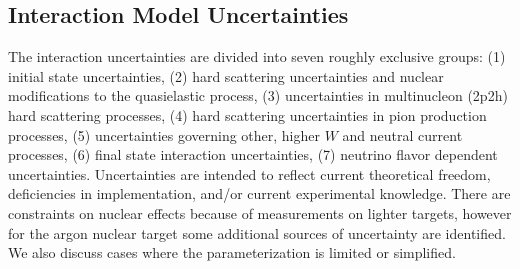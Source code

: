 
\subsection{Interaction Model Uncertainties}

The interaction uncertainties are divided into seven roughly exclusive groups: (1) initial state uncertainties, (2) hard scattering uncertainties and nuclear modifications to the quasielastic process, (3) uncertainties in multinucleon (2p2h) hard scattering processes, (4) hard scattering uncertainties in pion production processes, (5) uncertainties governing other, higher $W$ and neutral current processes, (6) final state interaction uncertainties, (7) neutrino flavor dependent uncertainties. Uncertainties are intended to reflect current theoretical freedom, deficiencies in implementation, and/or current experimental knowledge.  
There are constraints on nuclear effects because of measurements on lighter targets, however for the argon nuclear target some additional sources of uncertainty are identified.  We also discuss cases where the parameterization is limited or simplified.


